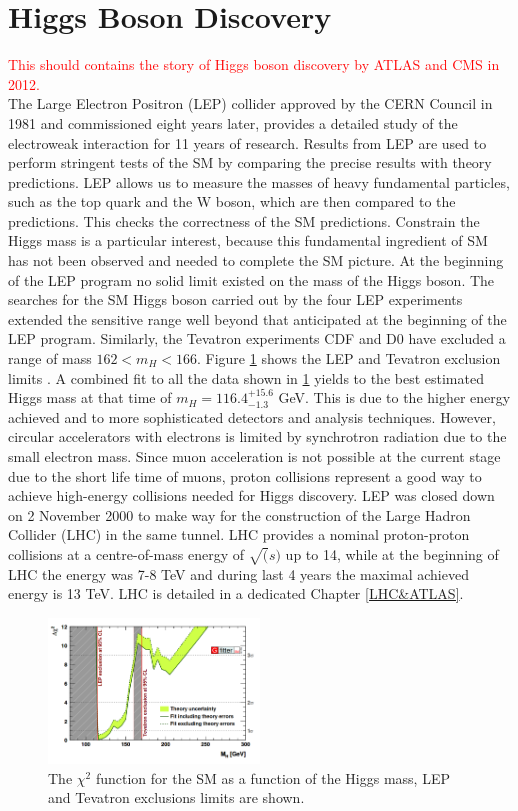 \section{Higgs Boson Discovery}
\label{chap1:H2012}
\textcolor{red}{This should contains the story of Higgs boson discovery by ATLAS and CMS in 2012. \\}
The Large Electron Positron (LEP) collider approved by the CERN Council in 1981 and commissioned eight years later, provides a detailed study of the electroweak interaction for 11 years of research. Results from LEP are used to perform stringent tests of the SM by comparing the precise results with theory predictions. LEP allows us to measure the masses of heavy fundamental particles, such as the top quark and the W boson, which are then compared to the predictions. This checks the correctness of the SM predictions. Constrain the Higgs mass is a particular interest, because this fundamental ingredient of SM has not been observed and needed to complete the SM picture. At the beginning of the LEP program no solid limit existed on the mass of the Higgs boson. The searches for the SM Higgs boson carried out by the four LEP experiments extended the sensitive range well beyond that anticipated at the beginning of the LEP program. Similarly, the Tevatron experiments CDF and D0 have excluded a range of mass $162 < m_{H} < 166$. Figure \ref{fig:chap1:H2012:LEP} shows the LEP and Tevatron exclusion limits \cite{LEP, Tevatron, LEP_Tevatron}. A combined fit to all the data shown in \ref{fig:chap1:H2012:LEP} yields to the best estimated Higgs mass at that time of $m_{H} = 116.4^{+15.6}_{-1.3}$ GeV. This is due to the higher energy achieved and to more sophisticated detectors and analysis techniques. However, circular accelerators with electrons is limited by synchrotron radiation due to the small electron mass. Since muon acceleration is not possible at the current stage due to the short life time of muons, proton collisions represent a good way to achieve high-energy collisions needed for Higgs discovery. LEP was closed down on 2 November 2000 to make way for the construction of the Large Hadron Collider (LHC) in the same tunnel. LHC provides a nominal proton-proton collisions at a centre-of-mass energy of $\sqrt(s)$ up to 14, while at the beginning of LHC the energy was 7-8 TeV and during last 4 years the maximal achieved energy is 13 TeV. LHC is detailed in a dedicated Chapter \ref{LHC&ATLAS}. 
\begin{figure}[htbp]
    \centering
    \includegraphics[width=0.5\textwidth]{Ch1/Img/LEP_Tevatron_limits.png}
    \caption{The $\chi^2$ function for the SM as a function of the Higgs mass, LEP and Tevatron exclusions limits are shown.}
    \label{fig:chap1:H2012:LEP}
\end{figure}
